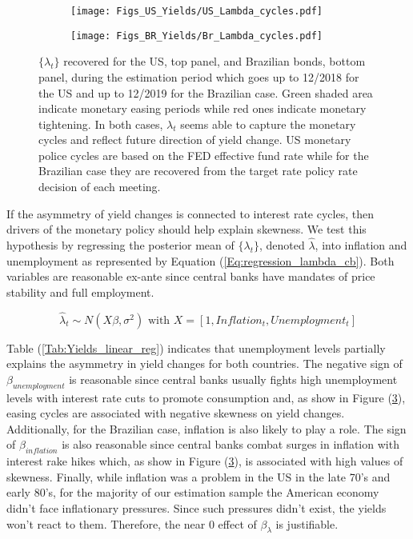 \documentclass{article}
\begin{document}
\begin{figure}[h!]
\centering
\begin{subfigure}[b]{0.95\textwidth}
\texttt{[image: Figs\_US\_Yields/US\_Lambda\_cycles.pdf]} 
   \caption{}
   \label{fig:Us_lambda_cycle} 
\end{subfigure}

\begin{subfigure}[b]{0.95\textwidth}
\texttt{[image: Figs\_BR\_Yields/Br\_Lambda\_cycles.pdf]} 
   \caption{}
   \label{fig:Br_lambda_cycle}
\end{subfigure}
\caption{$\{\lambda_t\}$ recovered for the US, top panel, and Brazilian bonds, bottom panel, during the estimation period which goes up to 12/2018 for the US and up to 12/2019 for the Brazilian case. Green shaded area indicate monetary easing periods while red ones indicate monetary tightening. In both cases, $\lambda_t$ seems able to capture the monetary cycles and reflect future direction of yield change. US monetary police cycles are based on the FED effective fund rate while for the Brazilian case they are recovered from the target rate policy rate decision of each meeting.}
\label{Fig:lambda_cycles}
\end{figure}

If the asymmetry of yield changes is connected to interest rate cycles, then drivers of the monetary policy should help explain skewness. We test this hypothesis by regressing the posterior mean of $\{\lambda_t\}$, denoted $\hat{\lambda}$, into inflation and unemployment as represented by Equation (\ref{Eq:regression_lambda_cb}). Both variables are reasonable  ex-ante since central banks have mandates of price stability and full employment. 

\begin{equation}\label{Eq:regression_lambda_cb}
    \hat{\lambda}_t \sim N(X \beta, \sigma^2) \text{ with } X = [1, Inflation_t, Unemployment_t]
\end{equation}

Table (\ref{Tab:Yields_linear_reg}) indicates that unemployment levels partially explains the asymmetry in yield changes for both countries. The negative sign of $\beta_{unemployment}$ is reasonable since central banks usually fights high unemployment levels with interest rate cuts to promote consumption and, as show in Figure (\ref{Fig:lambda_cycles}), easing cycles are associated with negative skewness on yield changes. Additionally, for the Brazilian case, inflation is also likely to play a role. The sign of $\beta_{inflation}$ is also reasonable since central banks combat surges in inflation with interest rake hikes which, as show in Figure (\ref{Fig:lambda_cycles}), is associated with high values of skewness. Finally, while inflation was a problem in the US in the late 70's and early 80's, for the majority of our estimation sample the American economy didn't face inflationary pressures. Since such pressures didn't exist, the yields won't react to them. Therefore, the near 0 effect of $\beta_{\lambda}$ is justifiable. 
\end{document}
